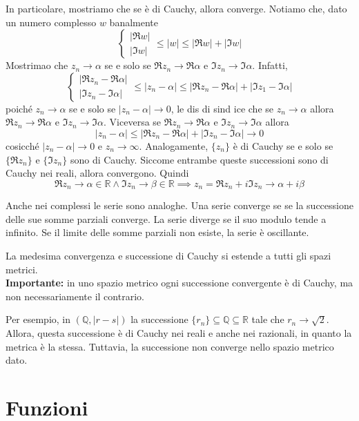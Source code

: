 \documentclass[a4paper]{article}
\begin{document}
In particolare, mostriamo che se è di Cauchy, allora converge.
Notiamo che, dato un numero complesso \(w\) banalmente
\[
    \begin{cases}
        |\Re w| \\ |\Im w|
    \end{cases}
    \leq |w| \leq |\Re w| + |\Im w|
\]
Mostrimao che \(z_n \to \alpha\) se e solo se \(\Re z_n \to \Re \alpha\)
e \(\Im z_n \to \Im \alpha\).
Infatti,
\[
    \begin{cases}
        |\Re z_n - \Re \alpha| \\ |\Im z_n - \Im \alpha|
    \end{cases}
    \leq |z_n - \alpha| \leq |\Re z_n - \Re \alpha| + |\Im z_1 - \Im \alpha|
\]
poiché \(z_n \to \alpha\) se e solo se \(|z_n - \alpha| \to 0\),
le dis di sind ice che se \(z_n \to \alpha\)
allora \(\Re z_n \to \Re \alpha\) e
\(\Im z_n \to \Im \alpha\).
Viceversa se \(\Re z_n \to \Re \alpha\) e \(\Im z_n \to \Im \alpha\)
allora
\[
    |z_n - \alpha| \leq |\Re z_n - \Re \alpha| + |\Im z_n - \Im \alpha| \to 0
\]
cosicché \(|z_n - \alpha| \to 0\) e \(z_n \to \infty\).
Analogamente, \(\{z_n\}\) è di Cauchy se e solo se \(\{\Re z_n\}\)
e \(\{\Im z_n\}\) sono di Cauchy.
Siccome entrambe queste successioni sono di Cauchy nei reali, allora convergono.
Quindi \[
    \Re z_n \to \alpha \in \mathbb{R} \land 
    \Im z_n \to \beta \in \mathbb{R}
    \implies z_n = \Re z_n + i\Im z_n \to \alpha + i\beta
\]

Anche nei complessi le serie sono analoghe. Una serie converge se
se la successione delle sue somme parziali converge.
La serie diverge se il suo modulo tende a infinito. Se il limite delle somme parziali non esiste,
la serie è oscillante.

La medesima convergenza e successione di Cauchy si estende a tutti gli spazi metrici. \\
\textbf{Importante:} in uno spazio metrico ogni successione convergente è di Cauchy, ma non necessariamente il contrario.

Per esempio, in \((\mathbb{Q}, |r-s|)\) la successione \(\{r_n\} \subseteq \mathbb{Q} \subseteq \mathbb{R}\)
tale che \(r_n \to \sqrt{2}\). Allora, questa successione è di Cauchy nei reali e anche nei razionali,
in quanto la metrica è la stessa. Tuttavia, la successione non converge nello spazio metrico dato.



\pagebreak

\section{Funzioni}
\end{document}
